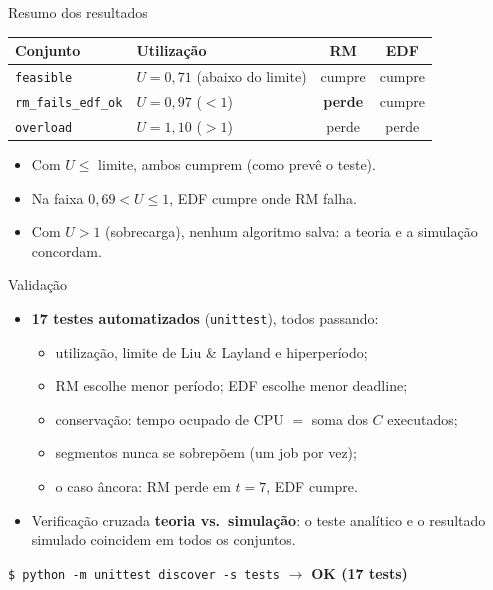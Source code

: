 \documentclass[aspectratio=169,xcolor=table]{beamer}
\begin{document}
\begin{frame}{Resumo dos resultados}
    \begin{table}
        \begin{tabularx}{\textwidth}{|l|X|c|c|}
            \hline
            \textbf{Conjunto} & \textbf{Utilização} & \textbf{RM} & \textbf{EDF} \\
            \hline
            \texttt{feasible} & $U=0{,}71$ (abaixo do limite) & cumpre & cumpre \\
            \hline
            \texttt{rm\_fails\_edf\_ok} & $U=0{,}97$ ($<1$) & \textcolor{latecol}{\textbf{perde}} & cumpre \\
            \hline
            \texttt{overload} & $U=1{,}10$ ($>1$) & \textcolor{latecol}{perde} & \textcolor{latecol}{perde} \\
            \hline
        \end{tabularx}
    \end{table}
    \begin{itemize}
        \item Com $U \le$ limite, ambos cumprem (como prevê o teste).
        \item Na faixa $0{,}69 < U \le 1$, EDF cumpre onde RM falha.
        \item Com $U > 1$ (sobrecarga), nenhum algoritmo salva: a teoria e a simulação concordam.
    \end{itemize}
\end{frame}

\begin{frame}{Validação}
    \begin{itemize}
        \item \textbf{17 testes automatizados} (\texttt{unittest}), todos passando:
        \begin{itemize}
            \item utilização, limite de Liu \& Layland e hiperperíodo;
            \item RM escolhe menor período; EDF escolhe menor deadline;
            \item conservação: tempo ocupado de CPU $=$ soma dos $C$ executados;
            \item segmentos nunca se sobrepõem (um job por vez);
            \item o caso âncora: RM perde em $t=7$, EDF cumpre.
        \end{itemize}
        \item Verificação cruzada \textbf{teoria vs.\ simulação}: o teste analítico e o resultado simulado coincidem em todos os conjuntos.
    \end{itemize}
    \begin{center}
        \small\texttt{\$ python -m unittest discover -s tests} $\rightarrow$ \textcolor{okcol}{\textbf{OK (17 tests)}}
    \end{center}
\end{frame}
\end{document}
